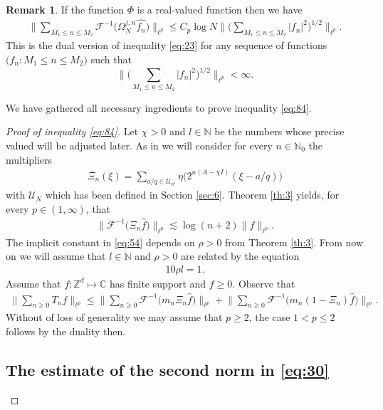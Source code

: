 \documentclass[a4paper,oneside]{amsart}
\theoremstyle{plain}
\theoremstyle{definition}
\newtheorem{remark}{Remark}[section]
\numberwithin{equation}{section}
\theoremstyle{plain}
\newcommand{\ZZ}{\mathbb{Z}}
\newcommand{\CC}{\mathbb{C}}
\newcommand{\NN}{\mathbb{N}}
\newcommand{\8}{\infty}
\begin{document}
\begin{remark}
  If the function $\Phi$ is a real-valued function then we have
  \begin{align}
    \label{eq:52}
   \Big\|\sum_{M_1\le n\le M_2}\mathcal
  F^{-1}\big(\Omega_{N}^{j, n}\hat{f_n}\big)\Big\|_{\ell^p}\le C_p \log N\bigg\|\Big(\sum_{M_1\le n\le M_2}|f_n|^2\Big)^{1/2}\bigg\|_{\ell^p}.    
  \end{align}
This is the dual version  
of inequality \eqref{eq:23} for any sequence of functions $\big(f_n:
M_1\le n\le M_2\big)$ such that 
\[
\bigg\|\Big(\sum_{M_1\le n\le M_2}|f_n|^2\Big)^{1/2}\bigg\|_{\ell^p}<\infty.
\]
\end{remark}


We have  gathered all necessary ingredients to prove inequality
\eqref{eq:84}. 
 

\begin{proof}[Proof of inequality \eqref{eq:84}]

  Let $\chi>0$ and $l\in\NN$ be the numbers whose precise valued will
  be adjusted later. As in \cite{mst1} we will consider for every
  $n\in\NN_0$ the multipliers
\begin{align}
  \label{eq:53}
  \Xi_{n}(\xi)=\sum_{a/q\in\mathscr U_{n^l}}\eta\big(2^{n(A-\chi I)}(\xi-a/q)\big)
\end{align}
with $\mathscr U_{N}$ which has been defined in Section \ref{sec:6}. 
Theorem \ref{th:3} yields, for every $p\in(1, \infty)$, that 
\begin{align}
  \label{eq:54}
  \big\|\mathcal
  F^{-1}\big(\Xi_{n}\hat{f}\big)\big\|_{\ell^p}\lesssim \log(n+2)\|f\|_{\ell^p}.
\end{align}
The implicit constant in \eqref{eq:54} depends on $\rho>0$ from
Theorem \ref{th:3}. From now on we will assume that $l\in\NN$ and
$\rho>0$ are related by the equation
\begin{align}
  \label{eq:62}
  10\rho l=1.
\end{align}
Assume  that $f:\ZZ^d\mapsto\CC$ has finite support and $f\ge0$. Observe that
\begin{align}
  \label{eq:30}
   \Big\|\sum_{n\ge0}T_{n}f\Big\|_{\ell^p}
\le 
  \Big\|\sum_{n\ge0}\mathcal
  F^{-1}\big(m_n\Xi_{n}\hat{f}\big)\Big\|_{\ell^p}
+ 
  \Big\|\sum_{n\ge0}\mathcal
  F^{-1}\big(m_n(1-\Xi_{n})\hat{f}\big)\Big\|_{\ell^p}.
\end{align}
Without of loss of generality we may assume that $p\ge 2$, the case
$1<p\le 2$ follows by the duality then. 
\subsection{The estimate of the second norm in \eqref{eq:30}}


\end{proof}
\end{document}
